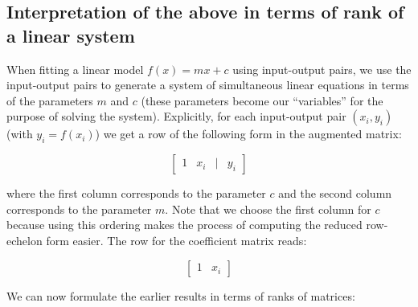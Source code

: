 \documentclass[10pt]{amsart}
\begin{document}
\subsection{Interpretation of the above in terms of rank of a linear system}

When fitting a linear model $f(x) = mx + c$ using input-output pairs,
we use the input-output pairs to generate a system of simultaneous
linear equations in terms of the parameters $m$ and $c$ (these
parameters become our ``variables'' for the purpose of solving the
system). Explicitly, for each input-output pair $(x_i,y_i)$ (with $y_i
= f(x_i)$) we get a row of the following form in the augmented matrix:

$$\left[ \begin{matrix} 1 & x_i & \mid & y_i \end{matrix}\right]$$

where the first column corresponds to the parameter $c$ and the second
column corresponds to the parameter $m$. Note that we choose the first
column for $c$ because using this ordering makes the process of
computing the reduced row-echelon form easier. The row for the
coefficient matrix reads:

$$\left[ \begin{matrix} 1 & x_i \end{matrix}\right]$$

We can now formulate the earlier results in terms of ranks of
matrices:
\end{document}
